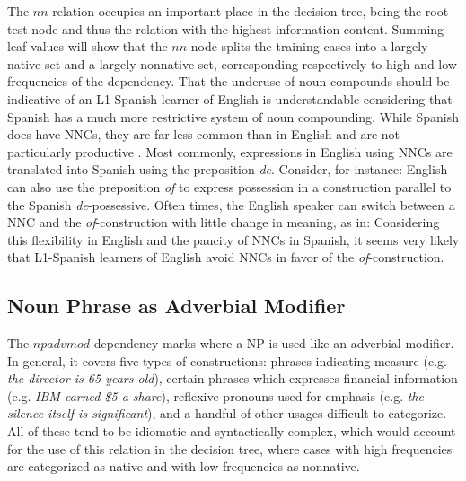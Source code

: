 \documentclass[main.tex]{subfiles}
\begin{document}
The $nn$ relation occupies an important place in the decision tree, being the root test node and thus the relation with the highest information content. Summing leaf values will show that the $nn$ node splits the training cases into a largely native set and a largely nonnative set, corresponding respectively to high and low frequencies of the dependency. That the underuse of noun compounds should be indicative of an L1-Spanish learner of English is understandable considering that Spanish has a much more restrictive system of noun compounding. While Spanish does have NNCs, they are far less common than in English and are not particularly productive \citep{piera:1995}. Most commonly, expressions in English using NNCs are translated into Spanish using the preposition \textit{de}. Consider, for instance:
English can also use the preposition \textit{of} to express possession in a construction parallel to the Spanish \textit{de}-possessive. Often times, the English speaker can switch between a NNC and the \textit{of}-construction with little change in meaning, as in:
Considering this flexibility in English and the paucity of NNCs in Spanish, it seems very likely that L1-Spanish learners of English avoid NNCs in favor of the \textit{of}-construction.

\subsection{Noun Phrase as Adverbial Modifier}

The $npadvmod$ dependency marks where a NP is used like an adverbial modifier. In general, it covers five types of constructions: phrases indicating measure (e.g. \textit{the director is 65 years old}), certain phrases which expresses financial information (e.g. \textit{IBM earned \$5 a share}), reflexive pronouns used for emphasis (e.g. \textit{the silence itself is significant}), and a handful of other usages difficult to categorize. All of these tend to be idiomatic and syntactically complex, which would account for the use of this relation in the decision tree, where cases with high frequencies are categorized as native and with low frequencies as nonnative.
\end{document}
